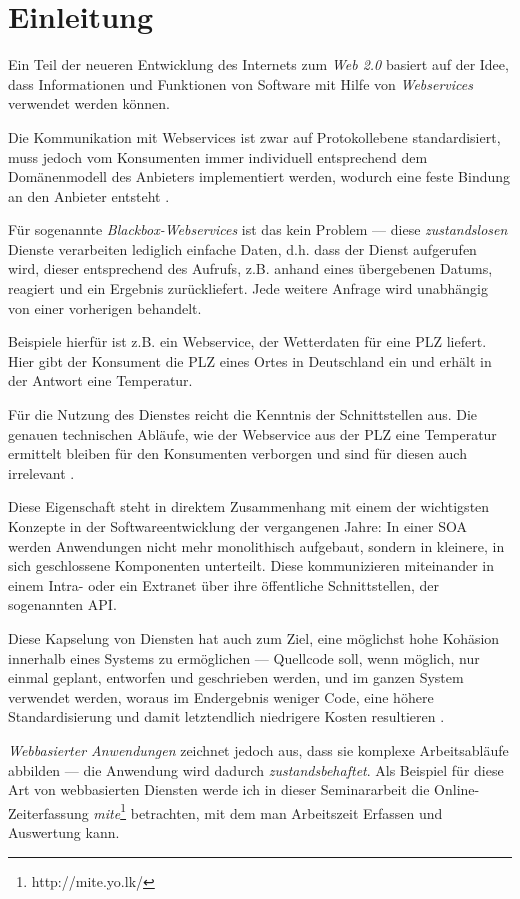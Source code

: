\section{Einleitung}
\label{l:einleitung}

Ein Teil der neueren Entwicklung des Internets zum \emph{Web 2.0} basiert auf der Idee, dass Informationen und Funktionen von Software mit Hilfe von \emph{Webservices} verwendet werden können.

Die Kommunikation mit Webservices ist zwar auf Protokollebene standardisiert, muss jedoch vom Konsumenten immer individuell entsprechend dem Domänenmodell des Anbieters implementiert werden, wodurch eine feste Bindung an den Anbieter entsteht \cite{ka-cots}.

Für sogenannte \emph{Blackbox-Webservices} ist das kein Problem --- diese \emph{zustandslosen} Dienste verarbeiten lediglich einfache Daten, d.h. dass der Dienst aufgerufen wird, dieser entsprechend des Aufrufs, z.B. anhand eines übergebenen Datums, reagiert und ein Ergebnis zurückliefert. Jede weitere Anfrage wird unabhängig von einer vorherigen behandelt.

Beispiele hierfür ist z.B. ein Webservice, der Wetterdaten für eine PLZ liefert. Hier gibt der Konsument die PLZ eines Ortes in Deutschland ein und erhält in der Antwort eine Temperatur. 

Für die Nutzung des Dienstes reicht die Kenntnis der Schnittstellen aus. Die genauen technischen Abläufe, wie der Webservice aus der PLZ eine Temperatur ermittelt bleiben für den Konsumenten verborgen und sind für diesen auch irrelevant \cite{hhxmlwssoa}.

Diese Eigenschaft steht in direktem Zusammenhang mit einem der wichtigsten Konzepte in der Softwareentwicklung der vergangenen Jahre: In einer \ac{SOA} werden Anwendungen nicht mehr monolithisch aufgebaut, sondern in kleinere, in sich geschlossene Komponenten unterteilt. Diese kommunizieren miteinander in einem Intra- oder ein Extranet über ihre öffentliche Schnittstellen, der sogenannten \ac{API}.

Diese Kapselung von Diensten hat auch zum Ziel, eine möglichst hohe Kohäsion innerhalb eines Systems zu ermöglichen --- Quellcode soll, wenn möglich, nur einmal geplant, entworfen und geschrieben werden, und im ganzen System verwendet werden, woraus im Endergebnis weniger Code, eine höhere Standardisierung und damit letztendlich niedrigere Kosten resultieren \cite{hn-web20}.

\emph{Webbasierter Anwendungen} zeichnet jedoch aus, dass sie komplexe Arbeitsabläufe abbilden --- die Anwendung wird dadurch \emph{zustandsbehaftet}. Als Beispiel für diese Art von webbasierten Diensten werde ich in dieser Seminararbeit die Online-Zeiterfassung \emph{mite}\footnote{http://mite.yo.lk/} betrachten, mit dem man Arbeitszeit Erfassen und Auswertung kann.

